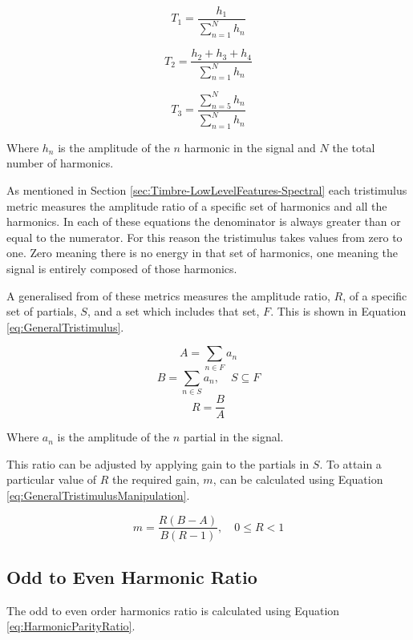 		\begin{equation}
			T_{1} = \frac{h_{1}}{\sum_{n = 1}^{N} h_{n}}
			\label{eq:Tristimulus1}
		\end{equation}

		\begin{equation}
			T_{2} = \frac{h_{2} + h_{3} + h_{4}}{\sum_{n = 1}^{N} h_{n}}
			\label{eq:Tristimulus2}
		\end{equation}

		\begin{equation}
			T_{3} = \frac{\sum_{n = 5}^{N} h_{n}}{\sum_{n = 1}^{N} h_{n}}
			\label{eq:Tristimulus3}
		\end{equation}

		Where $h_{n}$ is the amplitude of the $n$ harmonic in the signal and $N$ the total number of
		harmonics.

		As mentioned in Section \ref{sec:Timbre-LowLevelFeatures-Spectral} each tristimulus metric measures the
		amplitude ratio of a specific set of harmonics and all the harmonics. In each of these equations the
		denominator is always greater than or equal to the numerator. For this reason the tristimulus takes values
		from zero to one. Zero meaning there is no energy in that set of harmonics, one meaning the signal is
		entirely composed of those harmonics.

		A generalised from of these metrics measures the amplitude ratio, $R$, of a specific set of partials,
		$S$, and a set which includes that set, $F$. This is shown in Equation \ref{eq:GeneralTristimulus}.

		\[ A = \sum_{n \in F} a_{n} \]
		\[ B = \sum_{n \in S} a_{n}, \quad S \subseteq F \]
		\begin{equation}
			R = \frac{B}{A}
			\label{eq:GeneralTristimulus}
		\end{equation}

		Where $a_{n}$ is the amplitude of the $n$ partial in the signal.

		This ratio can be adjusted by applying gain to the partials in $S$. To attain a particular value of $R$
		the required gain, $m$, can be calculated using Equation \ref{eq:GeneralTristimulusManipulation}.

		\begin{equation}
			m = \frac{R(B - A)}{B(R - 1)}, \quad 0 \leq R < 1
			\label{eq:GeneralTristimulusManipulation}
		\end{equation}

	\subsection{Odd to Even Harmonic Ratio}
	\label{sec:FetureControl-Parameterisation-HarmonicParityRatio}
		The odd to even order harmonics ratio is calculated using Equation \ref{eq:HarmonicParityRatio}.
		
